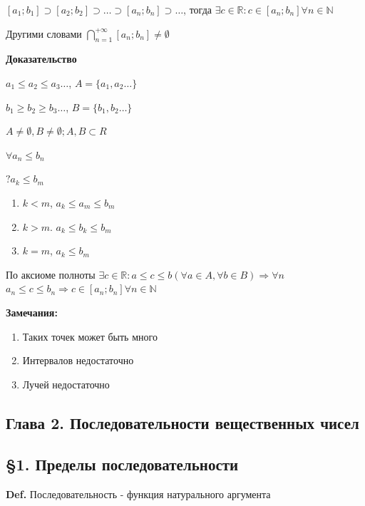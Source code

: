 \documentclass[14pt, letter paper]{article}
\begin{document}
$[a_1; b_1] \supset [a_2;b_2] \supset \ldots \supset [a_n;b_n] \supset \ldots$, тогда $\exists c \in \mathds{R}: c \in [a_n;b_n] \forall n \in \mathds{N}$

Другими словами $\bigcap\limits_{n=1}^{+ \infty} [a_n;b_n] \neq \emptyset$

\begin{center}
    \textbf{Доказательство}
\end{center}

$a_1 \leq a_2 \leq a_3 \ldots$, $A = \{ a_1, a_2 \ldots \}$

$b_1 \geq b_2 \geq b_3 \ldots$, $B = \{ b_1, b_2 \ldots \}$

$A \neq \emptyset, B \neq \emptyset; A, B \subset R$

$\forall a_n \leq b_n$

$?a_k \leq b_m$
\begin{enumerate}
    \item $k < m$, $a_k \leq a_m \leq b_m$
    \item $k > m$. $a_k \leq b_k \leq b_m$
    \item $k = m$, $a_k \leq b_m$
\end{enumerate}

По аксиоме полноты $\exists c \in \mathds{R}: a \leq c \leq b (\forall a \in A, \forall b \in B) \Rightarrow \forall n$ $a_n \leq c \leq b_n \Rightarrow c \in [a_n;b_n] \forall n \in \mathds{N}$

\textbf{Замечания:}
\begin{enumerate}
    \item Таких точек может быть много
    \item Интервалов недостаточно
    \item Лучей недостаточно
\end{enumerate}

\begin{center}
    \section*{Глава 2. Последовательности вещественных чисел}

    \subsection*{\S 1. Пределы последовательности}
\end{center}

\textbf{Def.} Последовательность - функция натурального аргумента
\end{document}
